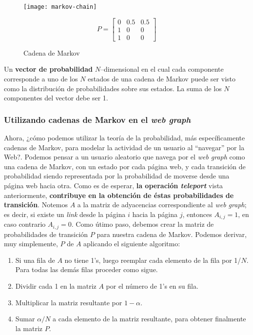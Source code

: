 			\begin{figure}[]
				\centering
				\texttt{[image: markov-chain]}
				
				\[
			P =
			\begin{bmatrix}
				0 & 0.5 & 0.5 \\
				1 & 0 & 0 \\
				1 & 0 & 0
			\end{bmatrix}
			\]
			
				\caption{Cadena de Markov}
			\end{figure}
			
			Un \textbf{vector de probabilidad} $N$--dimensional en el cual cada componente corresponde a uno de los $N$ estados de una cadena de Markov puede ser visto como la distribución de probabilidades sobre sus estados. La suma de los $N$ componentes del vector debe ser 1. \par
			
		\subsubsection{Utilizando cadenas de Markov en el \textit{web graph}}
			Ahora, ¿cómo podemos utilizar la teoría de la probabilidad, más específicamente cadenas de Markov, para modelar la actividad de un usuario al \enquote{navegar} por la Web?. Podemos pensar a un usuario aleatorio que navega por el \textit{web graph} como una cadena de Markov, con un estado por cada página web, y cada transición de probabilidad siendo representada por la probabilidad de moverse desde una página web hacia otra. Como es de esperar, \textbf{la operación \textit{teleport}} vista anteriormente, \textbf{contribuye en la obtención de éstas probabilidades de transición}. Notemos $A$ a la matriz de adyacencias correspondiente al \textit{web graph}; es decir, si existe un \textit{link} desde la página $i$ hacia la página $j$, entonces $A_{i,j} = 1$, en caso contrario $A_{i,j} = 0$. Como útimo paso, debemos crear la matriz de probabilidades de transición $P$ para nuestra cadena de Markov. Podemos derivar, muy simplemente, $P$ de $A$ aplicando el siguiente algoritmo:
			\begin{enumerate}
				\item Si una fila de $A$ no tiene 1's, luego reemplar cada elemento de la fila por 1/$N$. Para todas las demás filas proceder como sigue.
				\item Dividir cada 1 en la matriz $A$ por el número de 1's en su fila.
				\item Multiplicar la matriz resultante por $1 - \alpha $.
				\item Sumar $\alpha /N$ a cada elemento de la matriz resultante, para obtener finalmente la matriz $P$.
			\end{enumerate}
			
